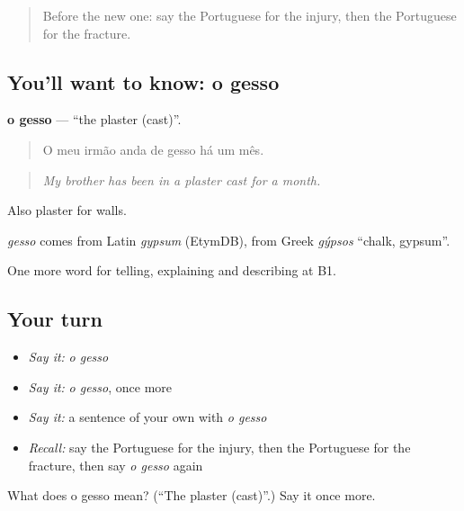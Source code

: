 \label{lesson:PT-C307-gesso}



\begin{quote}
Before the new one: say the Portuguese for the injury, then the Portuguese for the fracture.
\end{quote}

\subsection*{You'll want to know: o gesso}
\textbf{o gesso} — \textquotedblleft{}the plaster (cast)\textquotedblright{}.

\begin{quote}
O meu irmão anda de gesso há um mês.
\end{quote}

\begin{quote}
\emph{My brother has been in a plaster cast for a month.}
\end{quote}

Also plaster for walls.

\begin{cousinweb}
\emph{gesso} comes from Latin \emph{gypsum} (EtymDB), from Greek \emph{gýpsos} \textquotedblleft{}chalk, gypsum\textquotedblright{}.
\end{cousinweb}

\begin{grammarlens}[title={What you've built}]
One more word for telling, explaining and describing at B1.
\end{grammarlens}

\subsection*{Your turn}
\begin{itemize}
\raggedright
  \item \emph{Say it:} \emph{o gesso}
  \item \emph{Say it:} \emph{o gesso}, once more
  \item \emph{Say it:} a sentence of your own with \emph{o gesso}
  \item \emph{Recall:} say the Portuguese for the injury, then the Portuguese for the fracture, then say \emph{o gesso} again
\end{itemize}

\begin{tcolorbox}[breakable,colback=teal!4,colframe=teal!35!black,title={Before you move on}]
What does o gesso mean? (\textquotedblleft{}The plaster (cast)\textquotedblright{}.) Say it once more.
\end{tcolorbox}
